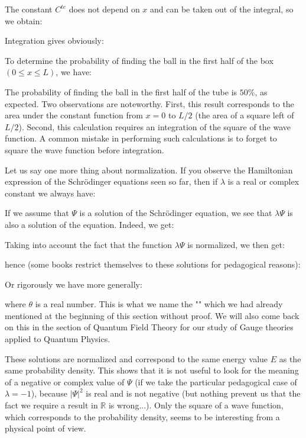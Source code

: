 	\begin{tcolorbox}[colframe=black,colback=white,sharp corners]
	The constant $C^{te}$ does not depend on $x$ and can be taken out of the integral, so we obtain:
	
	Integration gives obviously:
	
	To determine the probability of finding the ball in the first half of the box $( 0\le x\le L)$, we have:
	
	The probability of finding the ball in the first half of the tube is $50\%$, as expected. Two observations are noteworthy. First, this result corresponds to the area under the constant function from $x=0$ to $L/2$ (the area of a square left of $L/2$). Second, this calculation requires an integration of the square of the wave function. A common mistake in performing such calculations is to forget to square the wave function before integration.
	\end{tcolorbox}
	
	Let us say one more thing about normalization. If you observe the Hamiltonian expression of the Schrödinger equations seen so far, then if $\lambda$ is a real or complex constant we always have:
	
	If we assume that $\Psi$ is a solution of the Schrödinger equation, we see that $\lambda\Psi$ is also a solution of the equation. Indeed, we get:
	
	Taking into account the fact that the function $\lambda\Psi$ is normalized, we then get:
	
	hence (some books restrict themselves to these solutions for pedagogical reasons):
	
	Or rigorously we have more generally:
	
	where $\theta$ is a real number. This is what we name the "" which we had already mentioned at the beginning of this section without proof. We will also come back on this in the section of Quantum Field Theory for our study of Gauge theories applied to Quantum Physics.

	These solutions are normalized and correspond to the same energy value $E$ as the same probability density. This shows that it is not useful to look for the meaning of a negative or complex value of $\Psi$ (if we take the particular pedagogical case of $\lambda=-1$), because $|\Psi|^2$ is real and is not negative (but nothing prevent us that the fact we require a result in $\mathbb{R}$ is wrong...). Only the square of a wave function, which corresponds to the probability density, seems to be interesting from a physical point of view.
	
